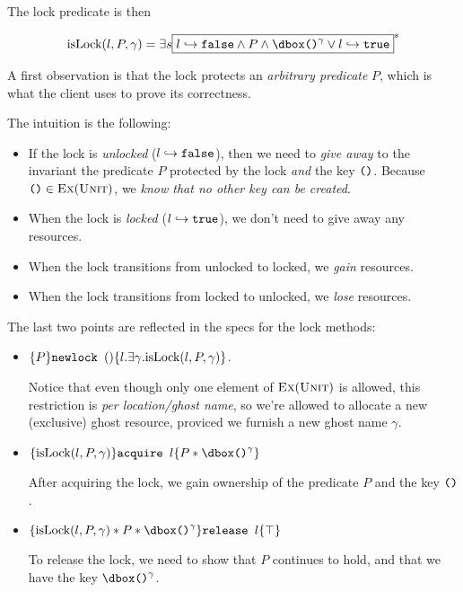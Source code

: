 The lock predicate is then

\[ \isLock{l}{P}{\gamma} = \exists{s}{\inv{$\pointsto{l}{\falselit} \land P \land \ownr{\unitlit}{\gamma} \lor \pointsto{l}{\truelit}  $}{s}} \]

A first observation is that the lock protects an \emph{arbitrary predicate} $P$, which is what the client uses to prove its correctness.

The intuition is the following:
\begin{itemize}

\item If the lock is \emph{unlocked} ($l \hookrightarrow \texttt{false}$), then we need to \emph{give away} to the invariant the predicate $P$ protected by the lock \emph{and} the key $\texttt{()}$. Because $\texttt{()} \in \textsc{Ex}(\textsc{Unit})$, we \emph{know that no other key can be created}.

\item When the lock is \emph{locked} ($l \hookrightarrow \texttt{true}$), we don't need to give away any resources.

\item When the lock transitions from unlocked to locked, we \emph{gain} resources.

\item When the lock transitions from locked to unlocked, we \emph{lose} resources.

\end{itemize}

The last two points are reflected in the specs for the lock methods:

\begin{itemize}

\item $\{P\} \texttt{newlock } () \{l.  \exists \gamma. \text{isLock}{(l, P, \gamma)}\}$.

Notice that even though only one element of $\textsc{Ex}(\textsc{Unit})$ is allowed, this restriction is \emph{per location/ghost name}, so we're allowed to allocate a new (exclusive) ghost resource, proviced we furnish a new ghost name $\gamma$.

\item $\hot{\isLock{l}{P}{\gamma}}{\texttt{acquire } l}{P * \ownr{\unitlit}{\gamma}}$

After acquiring the lock, we gain ownership of the predicate $P$ and the key $\texttt{()}$.

\item $\hot{\isLock{l}{P}{\gamma} * P * \ownr{\unitlit}{\gamma}}{\texttt{release } l}{\top}$

To release the lock, we need to show that $P$ continues to hold, and that we have the key $\ownr{\unitlit}{\gamma}$.

\end{itemize}

